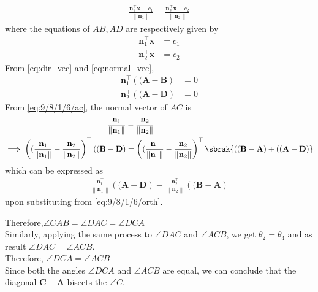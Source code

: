 \documentclass[a4paper,12pt,twocolumn]{article}
\providecommand{\norm}[1]{\left\lVert#1\right\rVert}
\let\vec\mathbf
\providecommand{\brak}[1]{\ensuremath{\left((#1\right)}}
\begin{document}
\begin{enumerate}
\begin{align}
	\frac{\vec{n}_1^{\top}\vec{x} - c_1}{\norm{\vec{n}_1}}
	= 
	\frac{\vec{n}_2^{\top}\vec{x} - c_2}{\norm{\vec{n}_2}}
\end{align}
where the equations of $AB, AD$ are respectively given by 
\begin{align}
	\vec{n}_1^{\top}\vec{x} &= c_1
	\\
	\vec{n}_2^{\top}\vec{x} &= c_2
\end{align}
From 
    \eqref{eq:dir_vec}
    and 
    \eqref{eq:normal_vec}, 
\begin{align}
	 \label{eq:9/8/1/6/orth}
	\vec{n}_1^{\top}\brak{\vec{A}-\vec{B}} &= 0
	\\
	\vec{n}_2^{\top}\brak{\vec{A}-\vec{D}}&= 0
\end{align}
%
From 
	 \eqref{eq:9/8/1/6/ac}, the normal vector of $AC$ is 
\begin{align}
	\frac{\vec{n}_1}{\norm{\vec{n}_1}}
	&- 
	\frac{\vec{n}_2}{\norm{\vec{n}_2}}
	\\
	\implies
	\brak{\frac{\vec{n}_1}{\norm{\vec{n}_1}}
	- 
	\frac{\vec{n}_2}{\norm{\vec{n}_2}}}^{\top}
\brak{\vec{B}-\vec{D}}
	&= 
	\brak{\frac{\vec{n}_1}{\norm{\vec{n}_1}}
	- 
	\frac{\vec{n}_2}{\norm{\vec{n}_2}}}^{\top}
	\sbrak{\brak{\vec{B}-\vec{A}}+
	\brak{\vec{A}-\vec{D}}}
\end{align}
which can be expressed as 
\begin{align}
	{\frac{\vec{n}_1^{\top}}{\norm{\vec{n}_1}}}\brak{\vec{A}-\vec{D}}
	- 
	\frac{\vec{n}_2^{\top}}{\norm{\vec{n}_2}}
	\brak{\vec{B}-\vec{A}}
\end{align}
upon substituting from 
	 \eqref{eq:9/8/1/6/orth}.
	 \fi

\end{enumerate}


\iffalse
Therefore,$\angle{CAB}=\angle{DAC}=\angle{DCA}$\\
Similarly, applying the same process to $\angle{DAC}$ and $\angle{ACB}$, we get $\theta_2=\theta_4$ and as result $\angle{DAC}=\angle{ACB}$.\\
Therefore, $\angle{DCA} = \angle{ACB}$\\
Since both the angles $\angle{DCA}$ and $\angle{ACB}$ are equal, we can conclude that the diagonal $\vec{C}-\vec{A}$ bisects the $\angle{C}$.\\ 
\end{document}
